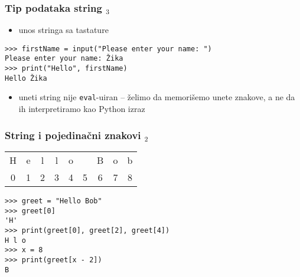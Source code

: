 \documentclass[utf8,compress,aspectratio=169]{beamer}
\begin{document}
\begin{frame}[fragile]
  \frametitle{Tip podataka string $_3$}
  \begin{itemize}
    \item unos stringa sa tastature
  \end{itemize}
\begin{verbatim}
>>> firstName = input("Please enter your name: ")
Please enter your name: Žika
>>> print("Hello", firstName)
Hello Žika
\end{verbatim}
  \begin{itemize}
    \item uneti string nije \texttt{eval}-uiran -- želimo da memorišemo unete znakove, a ne da ih interpretiramo kao Python izraz
  \end{itemize}
\end{frame}


\begin{frame}[fragile]
  \frametitle{String i pojedinačni znakovi $_2$}
\begin{tabular}{|c|c|c|c|c|c|c|c|c|}
\cline{1-9}
H & e & l & l & o & \  & B & o & b \\ \cline{1-9}
\multicolumn{1}{c}{0} & \multicolumn{1}{c}{1} & \multicolumn{1}{c}{2} & \multicolumn{1}{c}{3} & \multicolumn{1}{c}{4} & \multicolumn{1}{c}{5} & \multicolumn{1}{c}{6} & \multicolumn{1}{c}{7} & \multicolumn{1}{c}{8}
\end{tabular}
\begin{verbatim}
>>> greet = "Hello Bob"
>>> greet[0]
'H'
>>> print(greet[0], greet[2], greet[4])
H l o
>>> x = 8
>>> print(greet[x - 2])
B
\end{verbatim}
\end{frame}
\end{document}
